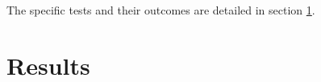 \documentclass[letterpaper, 10 pt, conference]{conf/ieeeconf}  %
\begin{document}
The specific tests and their outcomes are detailed in section \ref{sec:results}.


\section{Results}
\label{sec:results}
\end{document}
